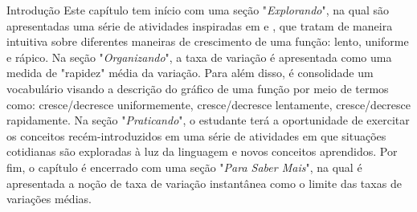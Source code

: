 \begin{apresentacao}{Introdução}
Este capítulo tem início com uma seção "\textit{Explorando}", na qual são apresentadas uma série de atividades inspiradas em \citep{andre2008} e \citep{swan1985}, que tratam de maneira intuitiva sobre diferentes maneiras de crescimento de uma função: lento, uniforme e rápico. Na seção "\textit{Organizando}", a taxa de variação é apresentada como uma medida de "rapidez"{} média da variação. Para além disso, é consolidade um vocabulário visando a descrição do gráfico de uma função por meio de termos como: cresce/decresce uniformemente, cresce/decresce lentamente, cresce/decresce rapidamente. Na seção "\textit{Praticando}"{}, o estudante terá a oportunidade de exercitar os conceitos recém-introduzidos em uma série de atividades em que situações cotidianas são exploradas à luz da linguagem e novos conceitos aprendidos. Por fim, o capítulo é encerrado com uma seção "\textit{Para Saber Mais}", na qual é apresentada a noção de taxa de variação instantânea como o limite das taxas de variações médias.
\end{apresentacao}

